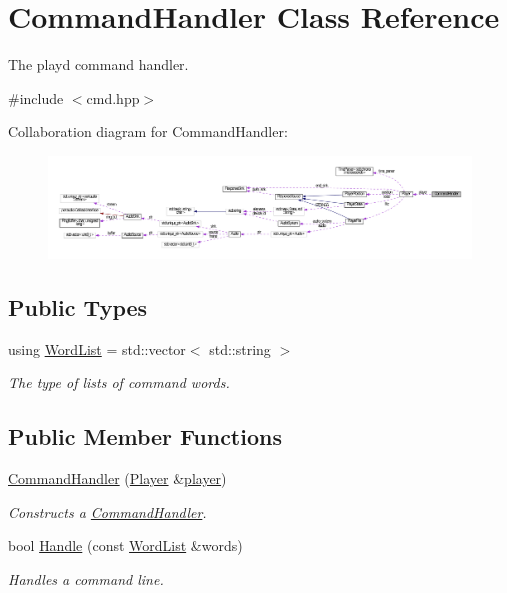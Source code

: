 \hypertarget{classCommandHandler}{\section{Command\+Handler Class Reference}
\label{classCommandHandler}
}


The playd command handler.  




{\ttfamily \#include $<$cmd.\+hpp$>$}



Collaboration diagram for Command\+Handler\+:
\nopagebreak
\begin{figure}[H]
\begin{center}
\leavevmode
\includegraphics[width=350pt]{classCommandHandler__coll__graph}
\end{center}
\end{figure}
\subsection*{Public Types}
\begin{DoxyCompactItemize}
\item 
\hypertarget{classCommandHandler_ae6cc650f171966041b385c8a4a766639}{using \hyperlink{classCommandHandler_ae6cc650f171966041b385c8a4a766639}{Word\+List} = std\+::vector$<$ std\+::string $>$}\label{classCommandHandler_ae6cc650f171966041b385c8a4a766639}

\begin{DoxyCompactList}\small\item\em The type of lists of command words. \end{DoxyCompactList}\end{DoxyCompactItemize}
\subsection*{Public Member Functions}
\begin{DoxyCompactItemize}
\item 
\hyperlink{classCommandHandler_ae4d47b90e2cf2ab6d514576fedeb2192}{Command\+Handler} (\hyperlink{classPlayer}{Player} \&\hyperlink{classCommandHandler_a398ba97a0625f5fbc3ced6679cfd3766}{player})
\begin{DoxyCompactList}\small\item\em Constructs a \hyperlink{classCommandHandler}{Command\+Handler}. \end{DoxyCompactList}\item 
bool \hyperlink{classCommandHandler_abc1ad0dfbff50db168d0a65cf05b169e}{Handle} (const \hyperlink{classCommandHandler_ae6cc650f171966041b385c8a4a766639}{Word\+List} \&words)
\begin{DoxyCompactList}\small\item\em Handles a command line. \end{DoxyCompactList}\end{DoxyCompactItemize}
